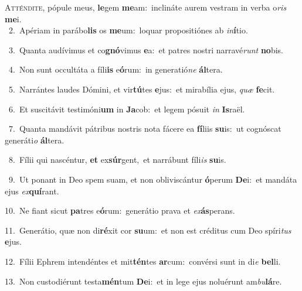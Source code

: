\lettrine{\initial\textcolor{\initialcolor}{A}}{tténdite,} pópule meus, \textbf{le}\-gem \textbf{me}\-am:~\star inclináte aurem vestram in verba o\textit{ris} \textbf{me}\-i.\\
{\numbfont\textcolor{\numbcolor}{~2.}}~Apériam in parábo\textbf{lis} os \textbf{me}\-um:~\star loquar propositiónes ab \textit{in}\-\textbf{í}tio.\par
{\numbfont\textcolor{\numbcolor}{~3.}}~Quanta audívimus et co\-\textbf{gnó}\-vimus \textbf{e}\-a:~\star et patres nostri narravé\textit{runt} \textbf{no}\-bis.\par
{\numbfont\textcolor{\numbcolor}{~4.}}~Non sunt occultáta a fíli\textbf{is} e\-\textbf{ó}\-rum:~\star in generatió\textit{ne} \textbf{ál}\-tera.\par
{\numbfont\textcolor{\numbcolor}{~5.}}~Narrántes laudes Dómini, et vir\-\textbf{tú}\-tes \textbf{e}\-jus:~\star et mirabília ejus, \textit{quæ} \textbf{fe}\-cit.\par
{\numbfont\textcolor{\numbcolor}{~6.}}~Et suscitávit testimóni\textbf{um} in \textbf{Ja}\-cob:~\star et legem pósuit \textit{in} \textbf{Is}\-raël.\par
{\numbfont\textcolor{\numbcolor}{~7.}}~Quanta mandávit pátribus nostris nota fácere ea \textbf{fí}\-liis \textbf{su}\-is:~\star ut cognóscat generáti\textit{o} \textbf{ál}\-tera.\par
{\numbfont\textcolor{\numbcolor}{~8.}}~Fílii qui nascéntur, \textbf{et} ex\-\textbf{súr}\-gent,~\star et narrábunt fíli\textit{is} \textbf{su}\-is.\par
{\numbfont\textcolor{\numbcolor}{~9.}}~Ut ponant in Deo spem suam, et non obliviscántur \textbf{ó}\-perum \textbf{De}\-i:~\star et mandáta ejus \textit{ex}\-\textbf{quí}rant.\par
{\numbfont\textcolor{\numbcolor}{10.}}~Ne fiant sicut \textbf{pa}\-tres e\-\textbf{ó}\-rum:~\star generátio prava et \textit{ex}\-\textbf{ás}perans.\par
{\numbfont\textcolor{\numbcolor}{11.}}~Generátio, quæ non di\-\textbf{ré}\-xit cor \textbf{su}\-um:~\star et non est créditus cum Deo spíri\textit{tus} \textbf{e}\-jus.\par
{\numbfont\textcolor{\numbcolor}{12.}}~Fílii Ephrem intendéntes et mit\-\textbf{tén}\-tes \textbf{ar}\-cum:~\star convérsi sunt in di\textit{e} \textbf{bel}\-li.\par
{\numbfont\textcolor{\numbcolor}{13.}}~Non custodiérunt testa\-\textbf{mén}\-tum \textbf{De}\-i:~\star et in lege ejus noluérunt am\-\textit{bu}\-\textbf{lá}re.\par

